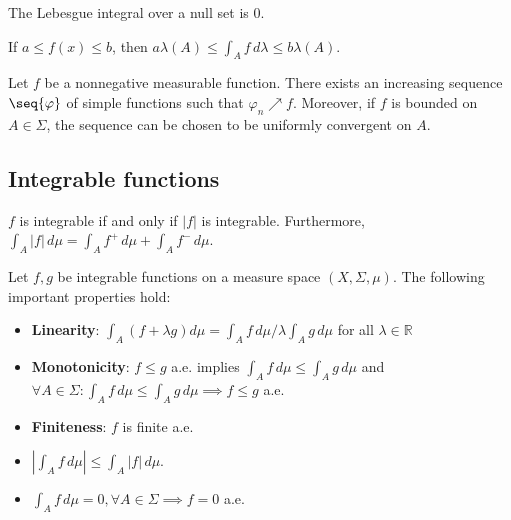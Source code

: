     \begin{property}
        The Lebesgue integral over a null set is 0.
    \end{property}

    \begin{theorem}
        If $a\leq f(x)\leq b$, then $a\lambda(A)\leq\int_Af\,d\lambda\leq b\lambda(A)$.
    \end{theorem}

    \begin{property}
        Let $f$ be a nonnegative measurable function. There exists an increasing sequence $\seq{\varphi}$ of simple functions such that $\varphi_n\nearrow f$. Moreover, if $f$ is bounded on $A\in\Sigma$, the sequence can be chosen to be uniformly convergent on $A$.
    \end{property}

\subsection{Integrable functions}


    \begin{property}\label{lebesgue:absolute_integrability}
        $f$ is integrable if and only if $|f|$ is integrable. Furthermore, $\int_A|f|\,d\mu = \int_Af^+\,d\mu + \int_Af^-\,d\mu$.
    \end{property}
    \begin{property}
        Let $f,g$ be integrable functions on a measure space $(X,\Sigma,\mu)$. The following important properties hold:
        \begin{itemize}
            \item\textbf{Linearity}: $\int_A(f+\lambda g)d\mu = \int_Af\,d\mu/\lambda\int_Ag\,d\mu$ for all $\lambda\in\mathbb{R}$
            \item\textbf{Monotonicity}: $f\leq g$ a.e. implies $\int_Af\,d\mu\leq\int_Ag\,d\mu$ and $\forall A\in\Sigma:\int_Af\,d\mu\leq\int_Ag\,d\mu\implies f\leq g$ a.e.
            \item\textbf{Finiteness}: $f$ is finite a.e.
            \item $|\int_Af\,d\mu|\leq\int_A|f|\,d\mu$.
            \item $\int_Af\,d\mu=0,\forall A\in\Sigma\implies f=0$ a.e.
        \end{itemize}
    \end{property}

